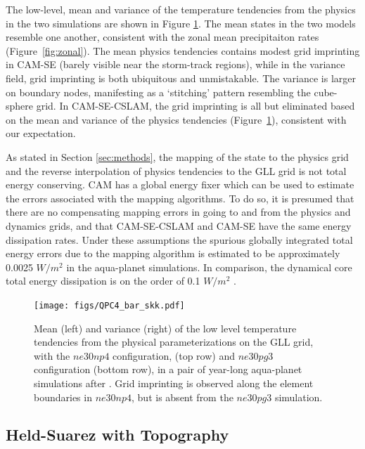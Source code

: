 \documentclass[twocol]{ametsoc}
\begin{document}
The low-level, mean and variance of the temperature tendencies from the physics in the two simulations are shown in Figure \ref{fig:tendency_imprint}. {\color{red}The mean states in the two models resemble one another, consistent with the zonal mean precipitaiton rates (Figure~\ref{fig:zonal}).{}} The mean physics tendencies contains modest grid imprinting in CAM-SE (barely visible near the storm-track regions), while in the variance field, grid imprinting is both ubiquitous and unmistakable. The variance is larger on boundary nodes, manifesting as a `stitching' pattern resembling the cube-sphere grid. In CAM-SE-CSLAM, the grid imprinting is all but eliminated based on the mean and variance of the physics tendencies (Figure~\ref{fig:tendency_imprint}), consistent with our expectation.

As stated in Section \ref{sec:methods}, the mapping of the state to the physics grid and the reverse interpolation of physics tendencies to the GLL grid is not total energy conserving. CAM has a global energy fixer \citep{WOHTTV2015JAMES} which can be used to estimate the errors associated with the mapping algorithms. To do so, it is presumed that there are no compensating mapping errors in going to and from the physics and dynamics grids, and that CAM-SE-CSLAM and CAM-SE have the same energy dissipation rates. Under these assumptions the spurious globally integrated total energy errors due to the mapping algorithm is estimated to be approximately 0.0025 $W/m^2$ in the aqua-planet simulations. In comparison, the dynamical core total energy dissipation is on the order of 0.1 $W/m^2$ \citep{LetAl2018JAMES}. 

\begin{figure}[t]
\noindent\texttt{[image: figs/QPC4\_bar\_skk.pdf]}\\
\caption{Mean (left) and variance (right) of the low level temperature tendencies from the physical parameterizations on the GLL grid, with the $ne30np4$ configuration, (top row) and $ne30pg3$ configuration (bottom row), in a pair of year-long aqua-planet simulations after \cite{MWO2016JAMES}. Grid imprinting is observed along the element boundaries in $ne30np4$, but is absent from the $ne30pg3$ simulation.}
\label{fig:tendency_imprint}
\end{figure}

\subsection{{\color{red}Held-Suarez with Topography{}}}
\end{document}
